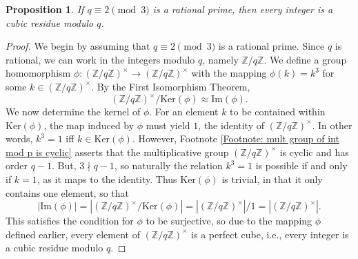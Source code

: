 \documentclass[10pt]{amsart}
\theoremstyle{plain}
\newtheorem{prop}[thm]{Proposition}
\theoremstyle{definition}
\theoremstyle{remark}
\numberwithin{equation}{section}
\begin{document}
\begin{prop}\label{Proposition about how every int is a cub res if q=2 mod 3}
    If $q\equiv 2\pmod{3}$ is a rational prime, then every integer is a cubic residue modulo $q$. 
\end{prop}
\begin{proof}
    We begin by assuming that $q\equiv 2\pmod{3}$ is a rational prime. Since $q$ is rational, we can work in the integers modulo $q$, namely $\mathbb{Z}/q\mathbb{Z}$. We define a group homomorphism $\phi:(\mathbb{Z}/q\mathbb{Z})^{\times} \rightarrow (\mathbb{Z}/q\mathbb{Z})^{\times}$ with the mapping $\phi(k)=k^{3}$ for some $k\in (\mathbb{Z}/q\mathbb{Z})^{\times}$. By the First Isomorphism Theorem, 
    \begin{equation*}
        (\mathbb{Z}/q\mathbb{Z})^{\times}/\text{Ker}(\phi)\approx \text{Im}(\phi).
    \end{equation*}
    We now determine the kernel of $\phi$. For an element $k$ to be contained within $\text{Ker}(\phi)$, the map induced by $\phi$ must yield $1$, the identity of $(\mathbb{Z}/q\mathbb{Z})^{\times}$. In other words, $k^{3}=1$ iff $k\in \text{Ker}(\phi)$. However, Footnote \ref{Footnote: mult group of int mod p is cyclic} asserts that the multiplicative group $(\mathbb{Z}/q\mathbb{Z})^{\times}$ is cyclic and has order $q-1$. But, $3\nmid q-1$, so naturally the relation $k^{3}=1$ is possible if and only if $k=1$, as it maps to the identity. Thus $\text{Ker}(\phi)$ is trivial, in that it only contains one element, so that 
    \begin{equation*}
        |\text{Im}(\phi)|=|(\mathbb{Z}/q\mathbb{Z})^{\times}/\text{Ker}(\phi)|=|(\mathbb{Z}/q\mathbb{Z})^{\times}|/1 = |(\mathbb{Z}/q\mathbb{Z})^{\times}|.
    \end{equation*}
    This satisfies the condition for $\phi$ to be surjective, so due to the mapping $\phi$ defined earlier, every element of $(\mathbb{Z}/q\mathbb{Z})^{\times}$ is a perfect cube, i.e., every integer is a cubic residue modulo $q$.
\end{proof}
\end{document}
